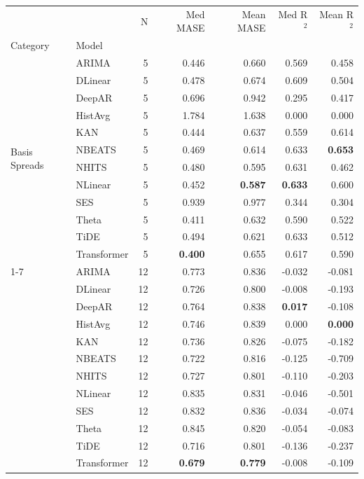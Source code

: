 \begin{tabular}{llrrrrr}
\toprule
 &  & N & Med MASE & Mean MASE & Med R$^2$ & Mean R$^2$ \\
Category & Model &  &  &  &  &  \\
\midrule
\multirow[t]{12}{*}{Basis Spreads} & ARIMA & 5 & 0.446 & 0.660 & 0.569 & 0.458 \\
 & DLinear & 5 & 0.478 & 0.674 & 0.609 & 0.504 \\
 & DeepAR & 5 & 0.696 & 0.942 & 0.295 & 0.417 \\
 & HistAvg & 5 & 1.784 & 1.638 & 0.000 & 0.000 \\
 & KAN & 5 & 0.444 & 0.637 & 0.559 & 0.614 \\
 & NBEATS & 5 & 0.469 & 0.614 & 0.633 & \textbf{0.653} \\
 & NHITS & 5 & 0.480 & 0.595 & 0.631 & 0.462 \\
 & NLinear & 5 & 0.452 & \textbf{0.587} & \textbf{0.633} & 0.600 \\
 & SES & 5 & 0.939 & 0.977 & 0.344 & 0.304 \\
 & Theta & 5 & 0.411 & 0.632 & 0.590 & 0.522 \\
 & TiDE & 5 & 0.494 & 0.621 & 0.633 & 0.512 \\
 & Transformer & 5 & \textbf{0.400} & 0.655 & 0.617 & 0.590 \\
\cline{1-7}
\multirow[t]{12}{*}{Returns} & ARIMA & 12 & 0.773 & 0.836 & -0.032 & -0.081 \\
 & DLinear & 12 & 0.726 & 0.800 & -0.008 & -0.193 \\
 & DeepAR & 12 & 0.764 & 0.838 & \textbf{0.017} & -0.108 \\
 & HistAvg & 12 & 0.746 & 0.839 & 0.000 & \textbf{0.000} \\
 & KAN & 12 & 0.736 & 0.826 & -0.075 & -0.182 \\
 & NBEATS & 12 & 0.722 & 0.816 & -0.125 & -0.709 \\
 & NHITS & 12 & 0.727 & 0.801 & -0.110 & -0.203 \\
 & NLinear & 12 & 0.835 & 0.831 & -0.046 & -0.501 \\
 & SES & 12 & 0.832 & 0.836 & -0.034 & -0.074 \\
 & Theta & 12 & 0.845 & 0.820 & -0.054 & -0.083 \\
 & TiDE & 12 & 0.716 & 0.801 & -0.136 & -0.237 \\
 & Transformer & 12 & \textbf{0.679} & \textbf{0.779} & -0.008 & -0.109 \\

\end{tabular}
